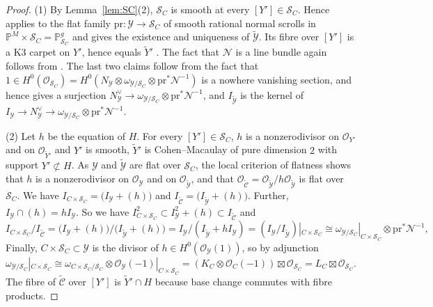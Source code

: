 \documentclass[11pt,twoside]{amsart}
\theoremstyle{plain}
\theoremstyle{definition}
\newcommand{\PP}{\mathbb{P}}
\newcommand{\PM}{\mathbb{P}^M}
\newcommand{\OO}{\mathcal{O}}
\newcommand{\Yt}{\widetilde{Y}}
\newcommand{\SC}{\mathcal{S}_C}
\newcommand{\cY}{\mathcal{Y}}
\newcommand{\cYt}{\widetilde{\mathcal{Y}}}
\newcommand{\cCt}{\widetilde{\mathcal{C}}}
\newcommand{\cN}{\mathcal{N}}
\newcommand{\pr}{\mathrm{pr}}
\begin{document}
\begin{proof}
(1) By Lemma~\ref{lem:SC}(2), $\SC$ is smooth at every $[Y']\in\SC$. Hence \cite[Prop.~3.7]{GP97} applies to the flat family $\pr\colon\cY\to\SC$ of smooth rational normal scrolls in $\PM\times\SC=\PP^g_{\SC}$ and gives the existence and uniqueness of $\cYt$. Its fibre over $[Y']$ is a K3 carpet on $Y'$, hence equals $\Yt'$ \cite[Prop.~1.7]{GP97}. The fact that $\cN$ is a line bundle again follows from \cite[Prop.~1.7]{GP97}. The last two claims follow from the fact that $1\in H^0(\OO_{\SC})=H^0(N_{\cY}\otimes\omega_{\cY/\SC}\otimes\pr^*\cN^{-1})$ is a nowhere vanishing section, and hence gives a surjection $N_{\cY}^{\vee}\to\omega_{\cY/\SC}\otimes\pr^*\cN^{-1}$, and $I_{\cYt}$ is the kernel of $I_{\cY}\to N_{\cY}^{\vee}\to\omega_{\cY/\SC}\otimes\pr^*\cN^{-1}$.

(2) Let $h$ be the equation of $H$. For every $[Y']\in\SC$, $h$ is a nonzerodivisor on $\OO_{Y'}$ and on $\OO_{\Yt'}$ and $Y'$ is smooth, $\Yt'$ is Cohen--Macaulay of pure dimension $2$ with support $Y'\not\subset H$. As $\cY$ and $\cYt$ are flat over $\SC$, the local criterion of flatness \cite[Cor.\ to Thm.~22.5]{Mat89} shows that $h$ is a nonzerodivisor on $\OO_{\cY}$ and on $\OO_{\cYt}$, and that $\OO_{\cCt}=\OO_{\cYt}/h\OO_{\cYt}$ is flat over $\SC$. We have $I_{C\times\SC} = \big(I_{\cY}+(h)\big)$ and $I_{\cCt} = \big(I_{\cYt}+(h)\big)$. Further, $I_{\cY}\cap(h)=hI_{\cY}$. So we have $I_{C\times\SC}^2\subset I_{\cY}^2+(h)\subset I_{\cCt}$ and
\[
I_{C\times\SC}/I_{\cCt}=\big(I_{\cY}+(h)\big)/\big(I_{\cYt}+(h)\big)=I_{\cY}/(I_{\cYt}+hI_{\cY})=(I_{\cY}/I_{\cYt})|_{C\times\SC}\cong\omega_{\cY/\SC}|_{C\times\SC}\otimes\pr^*\cN^{-1},
\]
Finally, $C\times\SC\subset\cY$ is the divisor of $h\in H^0(\OO_{\cY}(1))$, so by adjunction $\omega_{\cY/\SC}|_{C\times\SC}\cong\omega_{C\times\SC/\SC}\otimes\OO_{\cY}(-1)|_{C\times\SC}=(K_C\otimes\OO_C(-1))\boxtimes\OO_{\SC}=L_C\boxtimes\OO_{\SC}$. The fibre of $\cCt$ over $[Y']$ is $\Yt'\cap H$ because base change commutes with fibre products.


\end{proof}
\end{document}
